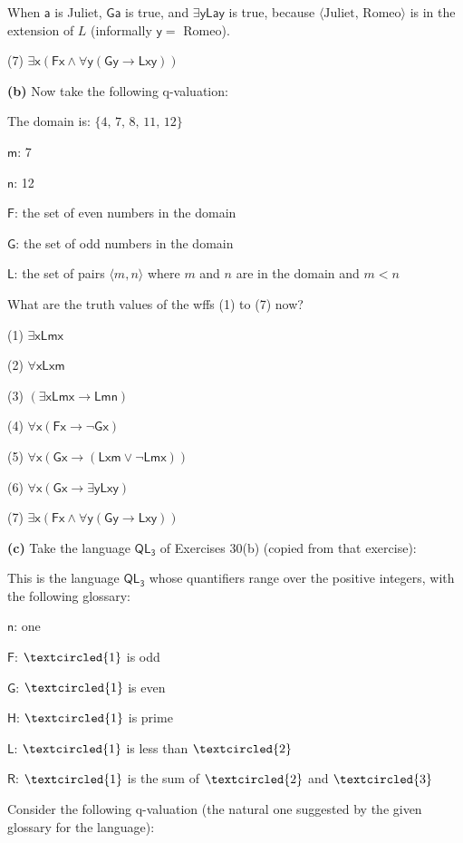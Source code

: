 \documentclass[14pt]{extarticle}
\begin{document}
When $\mathsf{a}$ is Juliet, $\mathsf{Ga}$ is true, and $\mathsf{\exists y Lay}$ is true, because $\langle \text{Juliet, Romeo}\rangle$ is in the extension of $L$ (informally $\mathsf{y} = $ Romeo).

(7) $\mathsf{\exists x (Fx \wedge \forall y(Gy \to Lxy))}$

{\bf(b)} Now take the following q-valuation:

The domain is: $\{\text{4, 7, 8, 11, 12}\}$

$\mathsf{m}$: 7

$\mathsf{n}$: 12

$\mathsf{F}$: the set of even numbers in the domain

$\mathsf{G}$: the set of odd numbers in the domain

$\mathsf{L}$: the set of pairs $\langle m, n\rangle$ where $m$ and $n$ are in the domain and $m < n$

What are the truth values of the wffs (1) to (7) now?

(1) $\mathsf{\exists xLmx}$

(2) $\mathsf{\forall xLxm}$

(3) $(\mathsf{\exists xLmx\to Lmn})$

(4) $\mathsf{\forall x(Fx \to \neg Gx)}$

(5) $\mathsf{\forall x(Gx \to (Lxm \vee \neg Lmx))}$

(6) $\mathsf{\forall x(Gx \to \exists yLxy)}$

(7) $\mathsf{\exists x (Fx \wedge \forall y(Gy \to Lxy))}$

{\bf(c)} Take the language $\mathsf{QL_3}$ of Exercises 30(b) (copied from that exercise):

This is the language $\mathsf{QL_3}$ whose quantifiers range over the positive integers, with the following glossary:

$\mathsf{n}$: one

$\mathsf{F}$: $\textcircled{\small{1}}$ is odd

$\mathsf{G}$: $\textcircled{\small{1}}$ is even

$\mathsf{H}$: $\textcircled{\small{1}}$ is prime

$\mathsf{L}$: $\textcircled{\small{1}}$ is less than $\textcircled{\small{2}}$

$\mathsf{R}$: $\textcircled{\small{1}}$ is the sum of $\textcircled{\small{2}}$ and $\textcircled{\small{3}}$

Consider the following q-valuation (the natural one suggested by the given glossary for the language):
\end{document}
